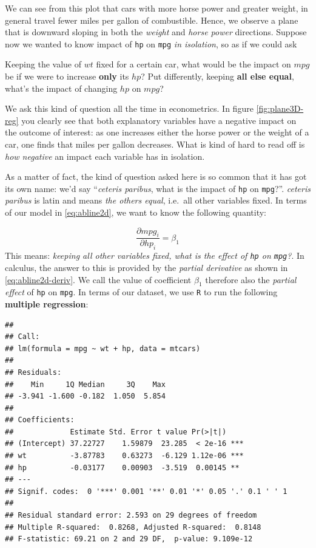 \documentclass[]{book}
\newenvironment{tip}{\begin{tcolorbox}[colback=green!5!white,colframe=green,title=\textbf{Tip:}]}{\end{tcolorbox}}
\theoremstyle{definition}
\theoremstyle{definition}
\theoremstyle{definition}
\theoremstyle{remark}
\begin{document}
We can see from this plot that cars with more horse power and greater
weight, in general travel fewer miles per gallon of combustible. Hence,
we observe a plane that is downward sloping in both the \emph{weight}
and \emph{horse power} directions. Suppose now we wanted to know impact
of \texttt{hp} on \texttt{mpg} \emph{in isolation}, so as if we could
ask

\begin{tip}
Keeping the value of \(wt\) fixed for a certain car, what would be the
impact on \(mpg\) be if we were to increase \textbf{only} its \(hp\)?
Put differently, keeping \textbf{all else equal}, what's the impact of
changing \(hp\) on \(mpg\)?
\end{tip}

 We ask this kind of question all the time in econometrics. In figure
\ref{fig:plane3D-reg} you clearly see that both explanatory variables
have a negative impact on the outcome of interest: as one increases
either the horse power or the weight of a car, one finds that miles per
gallon decreases. What is kind of hard to read off is \emph{how
negative} an impact each variable has in isolation.

As a matter of fact, the kind of question asked here is so common that
it has got its own name: we'd say ``\emph{ceteris paribus}, what is the
impact of \texttt{hp} on \texttt{mpg}?''. \emph{ceteris paribus} is
latin and means \emph{the others equal}, i.e.~all other variables fixed.
In terms of our model in \eqref{eq:abline2d}, we want to know the
following quantity:

\[
\frac{\partial mpg_i}{\partial hp_i} = \beta_1 \label{eq:abline2d-deriv}
\] This means: \emph{keeping all other variables fixed, what is the
effect of \texttt{hp} on \texttt{mpg}?}. In calculus, the answer to this
is provided by the \emph{partial derivative} as shown in
\eqref{eq:abline2d-deriv}. We call the value of coefficient \(\beta_1\)
therefore also the \emph{partial effect} of \texttt{hp} on \texttt{mpg}.
In terms of our dataset, we use \texttt{R} to run the following
\textbf{multiple regression}:

\begin{verbatim}
## 
## Call:
## lm(formula = mpg ~ wt + hp, data = mtcars)
## 
## Residuals:
##    Min     1Q Median     3Q    Max 
## -3.941 -1.600 -0.182  1.050  5.854 
## 
## Coefficients:
##             Estimate Std. Error t value Pr(>|t|)    
## (Intercept) 37.22727    1.59879  23.285  < 2e-16 ***
## wt          -3.87783    0.63273  -6.129 1.12e-06 ***
## hp          -0.03177    0.00903  -3.519  0.00145 ** 
## ---
## Signif. codes:  0 '***' 0.001 '**' 0.01 '*' 0.05 '.' 0.1 ' ' 1
## 
## Residual standard error: 2.593 on 29 degrees of freedom
## Multiple R-squared:  0.8268, Adjusted R-squared:  0.8148 
## F-statistic: 69.21 on 2 and 29 DF,  p-value: 9.109e-12
\end{verbatim}
\end{document}

